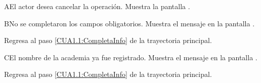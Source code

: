 
\begin{UCtrayectoriaA}{A}{El actor desea cancelar la operación.}
	\UCpaso [\UCsist] Muestra la pantalla . 
\end{UCtrayectoriaA}

\begin{UCtrayectoriaA}{B}{No se completaron los campos obligatorios.}
	\UCpaso [\UCsist] Muestra el mensaje  en la pantalla .
	
	\UCpaso Regresa al paso \ref{CUA1.1:CompletaInfo} de la trayectoria principal.
\end{UCtrayectoriaA}

\begin{UCtrayectoriaA}{C}{El nombre de la academia ya fue registrado.}
	\UCpaso [\UCsist] Muestra el mensaje  en la pantalla .
	
	\UCpaso Regresa al paso \ref{CUA1.1:CompletaInfo} de la trayectoria principal.
\end{UCtrayectoriaA}

%	


